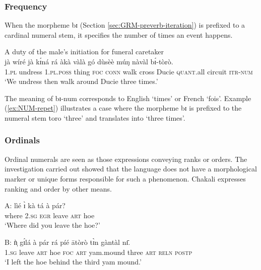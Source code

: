 \begin{exe}
\begin{exe}
\begin{exe}
{\begin{exe}
\begin{exe}
\begin{exe}
\begin{exe}
\begin{exe}
\begin{exe}
\begin{exe}
\begin{exe}
\begin{exe}
\subsubsection{Frequency}
\label{sec:NUM-repet}

When the morpheme {\sls bɪ}  (Section
\ref{sec:GRM-preverb-iteration}) is prefixed to a cardinal numeral  stem, it
specifies the number of times an event happens. 

 


\ea\label{ex:NUM-repet}{\rm A duty of the male's initiation for  funeral
caretaker}\\
 \gll jà wíré jà kɪ́ná rá àkà vàlà gó dùsèè múŋ nàvàl bɪ́-tòrò.\\
 \textsc{1.pl} undress  \textsc{1.pl.poss} thing \textsc{foc}  \textsc{conn} 
walk cross Ducie  \textsc{quant}.all  circuit \textsc{itr-num}\\
\glt  `We undress then walk around Ducie three times.'
\z


The meaning of {\sls bɪ}-{\sc num} corresponds to English `times' or  French 
`fois'.  Example (\ref{ex:NUM-repet}) illustrates a  case where  the morpheme 
{\sls bɪ} is prefixed to the numeral stem {\sls toro} `three' and translates 
into 
`three times'.



\subsubsection{Ordinals}
\label{sec:NUM-partitive}

Ordinal numerals are seen as those expressions conveying ranks or orders. The
investigation carried out  showed that the language
does not have a morphological marker or unique forms responsible for such a
phenomenon. Chakali expresses ranking and order by other
means.



\ea
\ea\label{ex:thirdmound}
\gll A: lìé ɪ̀ kà tá à pár?\\
 {} {where} \textsc{2.sg} \textsc{egr} {leave} \textsc{art} {hoe}\\
\glt   `Where did you leave the hoe?'

\gll B: ǹ̩ gɪ́lá à pár rá píé ātòrò tɪ̀n  gàntàl  nɪ̄.\\
 {}  \textsc{1.sg}  {leave} \textsc{art}   {hoe} \textsc{foc} 
\textsc{art} {yam.mound} {three} \textsc{art}  \textsc{reln}  \textsc{postp}\\
\glt   `I left the hoe behind the third yam mound.'


\end{exe}
\end{exe}
\end{exe}
\end{exe}
\end{exe}
\end{exe}
\end{exe}
\end{exe}
\end{exe}}
\end{exe}
\end{exe}
\end{exe}
